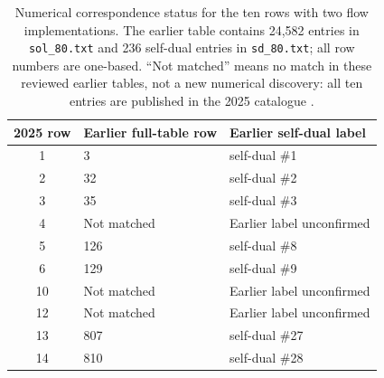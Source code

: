 \begin{table}[htbp]
\centering\small
\begin{tabular}{@{}cp{.28\linewidth}p{.48\linewidth}@{}}
\toprule
2025 row & Earlier full-table row & Earlier self-dual label\\
\midrule
1 & 3 & self-dual \#1\\
2 & 32 & self-dual \#2\\
3 & 35 & self-dual \#3\\
4 & Not matched & Earlier label unconfirmed\\
5 & 126 & self-dual \#8\\
6 & 129 & self-dual \#9\\
10 & Not matched & Earlier label unconfirmed\\
12 & Not matched & Earlier label unconfirmed\\
13 & 807 & self-dual \#27\\
14 & 810 & self-dual \#28\\
\bottomrule
\end{tabular}
\caption{Numerical correspondence status for the ten rows with two flow
implementations. The earlier table \cite{FreeData} contains 24,582
entries in \texttt{sol\_80.txt} and 236 self-dual entries in
\texttt{sd\_80.txt}; all row numbers are one-based. ``Not matched'' means
no match in these reviewed earlier tables, not a new numerical discovery:
all ten entries are published in the 2025 catalogue \cite{Data}.}
\label{tab:crosswalk}
\end{table}
